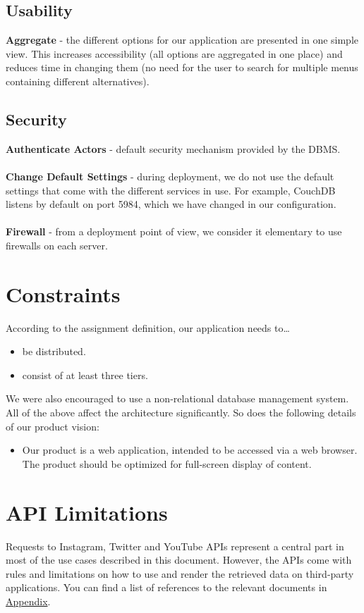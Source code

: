 \subsection{Usability}
\textbf{Aggregate} - the different options for our application are presented in
one simple view. This increases accessibility (all options are aggregated in
one place) and reduces time in changing them (no need for the user to search for
multiple menus containing different alternatives).

\subsection{Security}
\textbf{Authenticate Actors} - default security mechanism provided by the DBMS.
\\ \\
\textbf{Change Default Settings} - during deployment, we do not use the default
settings that come with the different services in use. For example, CouchDB
listens by default on port 5984, which we have changed in our configuration.
\\ \\
\textbf{Firewall} - from a deployment point of view, we consider it elementary
to use firewalls on each server.

\section{Constraints}

According to the assignment definition, our application needs to\dots
\begin{itemize}
  \item be distributed.
  \item consist of at least three tiers.
\end{itemize}
We were also encouraged to use a non-relational database management system. \\

All of the above affect the architecture significantly. So does the following
details of our product vision:
\begin{itemize}
   \item Our product is a web application, intended to be accessed via a web
    browser. The product should be optimized for full-screen display of content.
\end{itemize}

\hypertarget{apilimits}{
\section{API Limitations}}
Requests to Instagram, Twitter and YouTube APIs represent a central part in
most of the use cases described in this document. However, the APIs come with
rules and limitations on how to use and render the retrieved data on third-party
applications. You can find a list of references to the relevant documents in
\hyperlink{refapis}{Appendix}. \\

